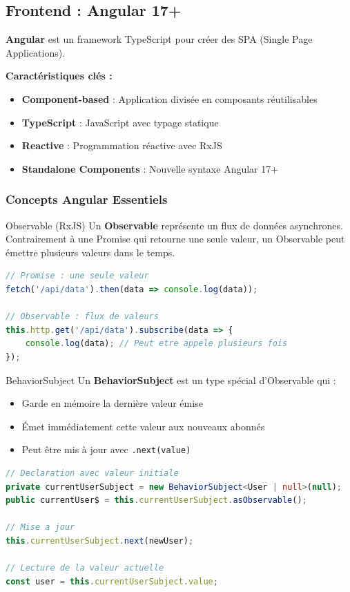 \documentclass[12pt,a4paper]{article}
\begin{document}
\newpage

\subsection{Frontend : Angular 17+}

\begin{angularbox}
\textbf{Angular} est un framework TypeScript pour créer des SPA (Single Page Applications).

\textbf{Caractéristiques clés :}
\begin{itemize}
    \item \textbf{Component-based} : Application divisée en composants réutilisables
    \item \textbf{TypeScript} : JavaScript avec typage statique
    \item \textbf{Reactive} : Programmation réactive avec RxJS
    \item \textbf{Standalone Components} : Nouvelle syntaxe Angular 17+
\end{itemize}
\end{angularbox}

\subsubsection{Concepts Angular Essentiels}

\begin{defbox}{Observable (RxJS)}
Un \textbf{Observable} représente un flux de données asynchrones. Contrairement à une Promise qui retourne une seule valeur, un Observable peut émettre plusieurs valeurs dans le temps.

\begin{lstlisting}[language=TypeScript]
// Promise : une seule valeur
fetch('/api/data').then(data => console.log(data));

// Observable : flux de valeurs
this.http.get('/api/data').subscribe(data => {
    console.log(data); // Peut etre appele plusieurs fois
});
\end{lstlisting}
\end{defbox}

\begin{defbox}{BehaviorSubject}
Un \textbf{BehaviorSubject} est un type spécial d'Observable qui :
\begin{itemize}
    \item Garde en mémoire la dernière valeur émise
    \item Émet immédiatement cette valeur aux nouveaux abonnés
    \item Peut être mis à jour avec \texttt{.next(value)}
\end{itemize}

\begin{lstlisting}[language=TypeScript]
// Declaration avec valeur initiale
private currentUserSubject = new BehaviorSubject<User | null>(null);
public currentUser$ = this.currentUserSubject.asObservable();

// Mise a jour
this.currentUserSubject.next(newUser);

// Lecture de la valeur actuelle
const user = this.currentUserSubject.value;
\end{lstlisting}
\end{defbox}
\end{document}
